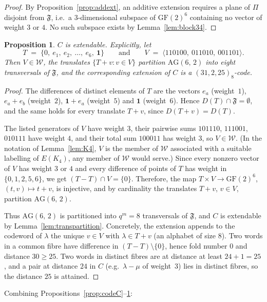 \documentclass[12pt]{article}
\newtheorem{prop}[thm]{Proposition}
\theoremstyle{definition}
\numberwithin{equation}{section}
\newcommand{\la}{\lambda}
\newcommand{\W}{\mathcal{W}}
\newcommand{\GF}[1]{\mathrm{GF}(#1)}
\newcommand{\AG}[2]{\mathrm{AG}(#1,\,#2)}
\newcommand{\onevec}{\mathbf{1}}
\newcommand{\Afold}{\mathfrak{F}}
\begin{document}
\begin{proof}
By Proposition~\ref{prop:addext}, an additive extension requires a plane of $\Pi$ disjoint from $\Afold$, i.e.\ a $3$-dimensional subspace of $\GF2^6$ containing no vector of weight $3$ or $4$.  No such subspace exists by Lemma~\ref{lem:block34}.
\end{proof}

\begin{prop}\label{prop:ext}
$C$ is extendable.  Explicitly, let
\[
  T \;=\; \{0,\ e_1,\ e_2,\ \ldots,\ e_6,\ \onevec\}
  \qquad\text{and}\qquad
  V \;=\;\langle 110100,\ 011010,\ 001101\rangle .
\]
Then $V\in\W$, the translates $\{T+v : v\in V\}$ partition $\AG62$ into eight transversals of $\Afold$, and the corresponding extension of $C$ is a $(31,2,25)_8$-code.
\end{prop}

\begin{proof}
The differences of distinct elements of $T$ are the vectors $e_a$ (weight~$1$), $e_a+e_b$ (weight~$2$), $\onevec+e_a$ (weight~$5$) and $\onevec$ (weight~$6$). Hence $D(T)\cap\Afold=\emptyset$, and the same holds for every translate $T+v$, since $D(T+v)=D(T)$.

The listed generators of $V$ have weight $3$, their pairwise sums $101110$, $111001$, $010111$ have weight $4$, and their total sum $100011$ has weight $3$, so $V\in\W$.  (In the notation of Lemma~\ref{lem:K4}, $V$ is the member of $\W$ associated with a suitable labelling of $E(K_4)$, any member of $\W$ would serve.)  Since every nonzero vector of $V$ has weight $3$ or $4$ and every difference of points of $T$ has weight in $\{0,1,2,5,6\}$, we get $(T-T)\cap V=\{0\}$. Therefore, the map $T\times V\to\GF2^6$, $(t,v)\mapsto t+v$, is injective, and by cardinality the translates $T+v$, $v\in V$, partition $\AG62$.

Thus $\AG62$ is partitioned into $q^m=8$ transversals of $\Afold$, and $C$ is extendable by Lemma~\ref{lem:transpartition}.  Concretely, the extension appends to the codeword of $\la$ the unique $v\in V$ with $\la\in T+v$ (an alphabet of size $8$). Two words in a common fibre have difference in $(T-T)\setminus\{0\}$, hence fold number $0$ and distance $30\geq25$. Two words in distinct fibres are at distance at least $24+1=25$, and a pair at distance $24$ in $C$ (e.g.\ $\la-\mu$ of weight~$3$) lies in distinct fibres, so the distance $25$ is attained.
\end{proof}

Combining Propositions~\ref{prop:codeC}--\ref{prop:ext}:
\end{document}
